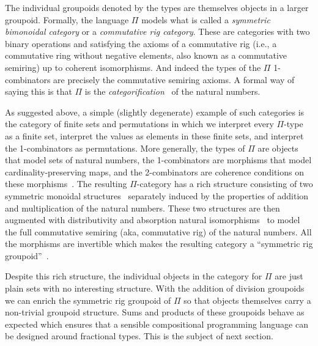 The individual groupoids denoted by the types are themselves objects
in a larger groupoid. Formally, the language $\Pi$ models what is
called a \emph{symmetric bimonoidal category} or a \emph{commutative
  rig category}. These are categories with two binary operations and
satisfying the axioms of a commutative rig (i.e., a commutative ring
without negative elements, also known as a commutative semiring) up to
coherent isomorphisms. And indeed the types of the $\Pi$ 1-combinators
are precisely the commutative semiring axioms. A formal way of saying
this is that $\Pi$ is the \emph{categorification}~\cite{math/9802029}
of the natural numbers.

As suggested above, a simple (slightly degenerate) example of such
categories is the category of finite sets and permutations in which we
interpret every $\Pi$-type as a finite set, interpret the values as
elements in these finite sets, and interpret the 1-combinators as
permutations. More generally, the types of $\Pi$ are objects that
model sets of natural numbers, the 1-combinators are morphisms that
model cardinality-preserving maps, and the 2-combinators are coherence
conditions on these morphisms~\cite{Carette2016}. The resulting
$\Pi$-category has a rich structure consisting of two symmetric
monoidal structures~\cite{nla.cat-vn1051288} separately induced by the
properties of addition and multiplication of the natural
numbers. These two structures are then augmented with distributivity
and absorption natural isomorphisms~\cite{laplaza} to model the full
commutative semiring (aka, commutative rig) of the natural
numbers. All the morphisms are invertible which makes the resulting
category a ``symmetric rig groupoid''~\cite{nlabrig}.

Despite this rich structure, the individual objects in the category for $\Pi$
are just plain sets with no interesting structure. With the addition of division
groupoids we can enrich the symmetric rig groupoid of $\Pi$ so that objects
themselves carry a non-trivial groupoid structure. Sums and products of these
groupoids behave as expected which ensures that a sensible compositional
programming language can be designed around fractional types. This is the
subject of next section.



